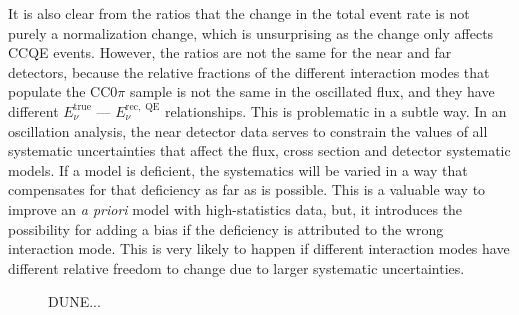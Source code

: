It is also clear from the ratios that the change in the total event rate is not purely a normalization change, which is unsurprising as the change only affects CCQE events. However, the ratios are not the same for the near and far detectors, because the relative fractions of the different interaction modes that populate the CC0$\pi$ sample is not the same in the oscillated flux, and they have different $E_{\nu}^{\mathrm{true}}$ --- $E^{\mathrm{rec,\;QE}}_{\nu}$ relationships. This is problematic in a subtle way. In an oscillation analysis, the near detector data serves to constrain the values of all systematic uncertainties that affect the flux, cross section and detector systematic models. If a model is deficient, the systematics will be varied in a way that compensates for that deficiency as far as is possible. This is a valuable way to improve an {\it a priori} model with high-statistics data, but, it introduces the possibility for adding a bias if the deficiency is attributed to the wrong interaction mode. This is very likely to happen if different interaction modes have different relative freedom to change due to larger systematic uncertainties.



\begin{figure}[htbp]
  \centering
  \hspace{75pt}
  \caption{DUNE...}
  \label{fig:dune_impact}
\end{figure}
